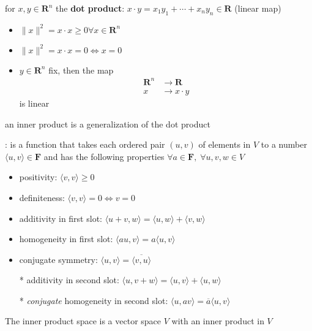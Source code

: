 \begin{description}
\item for $x,y\in \mathbf{R}^n$ the \textbf{dot product}: $x\cdot y = x_1y_1 + \cdots + x_ny_n \in \mathbf{R}$ (linear map)
\begin{itemize}
\item $\|x\|^2 = x\cdot x \ge 0 \forall x\in\mathbf{R}^n$
\item $\|x\|^2 = x\cdot x = 0 \iff x=0$
\item $y\in \mathbf{R}^n$ fix, then the map
\begin{align*}
\mathbf{R}^n &\to\mathbf{R} \\
x & \to x\cdot y
\end{align*} 
is linear
\end{itemize}
\item an inner product is a generalization of the dot product
\item[Hermitian inner product\label{itm:D6_inner_product}]: is a function that takes each ordered pair $(u,v)$ of elements in $V$ to a number $\langle u, v \rangle\in \mathbf{F}$ and has the following properties $\forall a\in \mathbf{F},\;\forall u, v,w\in V$
\begin{itemize}
\item positivity: $\langle v, v \rangle \geq 0$
\item definiteness: $\langle v, v \rangle = 0 \iff v=0$
\item additivity in first slot: $\langle u+v, w \rangle = \langle u, w \rangle + \langle v, w \rangle $
\item homogeneity in first slot: $\langle au, v \rangle = a\langle u, v \rangle$
\item conjugate symmetry: $\langle u, v\rangle = \overline{\langle v, u\rangle}$
\item[*] additivity in second slot: $\langle u, v+w \rangle = \langle u, v \rangle + \langle u, w \rangle $
\item[*] \emph{conjugate} homogeneity in second slot: $\langle u, av \rangle = \overline{a}\langle u, v \rangle$
\end{itemize}

\item[Inner product space] The inner product space is a vector space $V$ with an inner product in $V$


\end{description}
